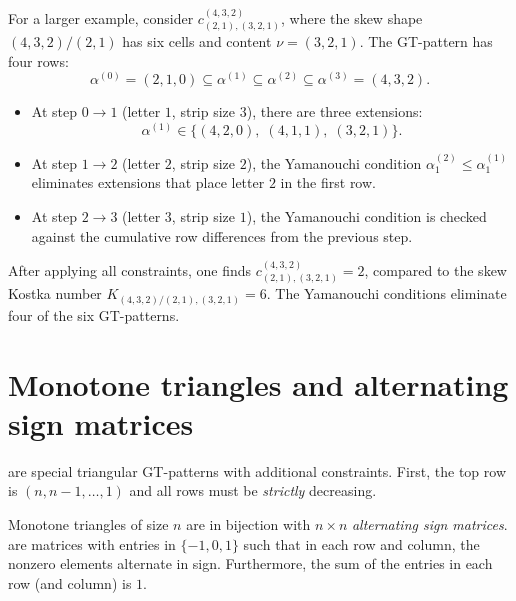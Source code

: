 \begin{example*}
For a larger example, consider $c^{(4,3,2)}_{(2,1),(3,2,1)}$,
where the skew shape $(4,3,2)/(2,1)$ has six cells and content $\nu = (3,2,1)$.
The GT-pattern has four rows:
\[
\alpha^{(0)} = (2,1,0) \subseteq \alpha^{(1)}
\subseteq \alpha^{(2)} \subseteq \alpha^{(3)} = (4,3,2).
\]
\begin{itemize}
\item At step $0 \to 1$ (letter $1$, strip size $3$), there are three extensions:
\[
\alpha^{(1)} \in \{(4,2,0),\; (4,1,1),\; (3,2,1)\}.
\]
\item At step $1 \to 2$ (letter $2$, strip size $2$),
the Yamanouchi condition $\alpha^{(2)}_1 \leq \alpha^{(1)}_1$ eliminates
extensions that place letter $2$ in the first row.
\item At step $2 \to 3$ (letter $3$, strip size $1$),
the Yamanouchi condition is checked against the cumulative
row differences from the previous step.
\end{itemize}
After applying all constraints, one finds
$c^{(4,3,2)}_{(2,1),(3,2,1)} = 2$,
compared to the skew Kostka number
$K_{(4,3,2)/(2,1),(3,2,1)} = 6$.
The Yamanouchi conditions eliminate four of the six GT-patterns.
\end{example*}




\section[alternatingSignMatrix]{Monotone triangles and alternating sign matrices}

\label{monotoneTriangle} are special triangular
GT-patterns with additional constraints.
First, the top row is $(n,n-1,\dotsc,1)$ and all rows must be
\emph{strictly} decreasing.

Monotone triangles of size $n$ are in bijection with $n \times n$
\emph{alternating sign matrices}.
\label{alternatingSignMatrixDefinition}
are matrices with entries in $\{-1,0,1\}$
such that in each row and column, the nonzero elements alternate in sign.
Furthermore, the sum of the entries in each row (and column) is $1$.

